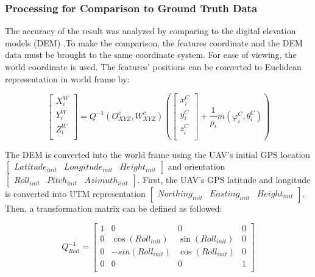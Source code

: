 \subsubsection{Processing for Comparison to Ground Truth Data}
The accuracy of the result was analyzed by comparing to the digital 
elevation models (DEM) .To make the comparison, the features coordinate 
and the DEM data must be brought to the same coordinate system. For ease 
of viewing, the world coordinate is used. The features' positions can be 
converted to Euclidean representation in world frame by: 

\begin{equation} 
\begin{bmatrix}
X_{i}^{W} \\
Y_{i}^{W} \\
Z_{i}^{W} \\
\end{bmatrix}
=Q^{-1}(O_{XYZ}^{c}, W_{XYZ}^{c})(\begin{bmatrix}
x_{i}^{C} \\
y_{i}^{C} \\
z_{i}^{C} \\
\end{bmatrix}
+\frac{1}{\rho _{i}}m(\varphi _{i}^{C}, \theta _{i}^{C}))
\end{equation}

The DEM is converted into the world frame using the UAV's initial GPS
location $\begin{bmatrix} Latitude_{init} & Longitude_{init} &
  Height_{init} \end{bmatrix}$ and orientation$\begin{bmatrix}
  Roll_{init} & Pitch_{init } & Azimuth_{init} \end{bmatrix}$. First,
the UAV's GPS latitude and longitude is converted into UTM
representation $\begin{bmatrix} Northing_{init} & Easting_{init} &
  Height_{init} \end{bmatrix}$. Then, a transformation matrix can be
defined as followed:


\begin{equation}
Q_{Roll}^{-1}=\begin{bmatrix}
1 & 0 & 0 & 0 \\
0 & \cos (Roll_{init}) & \sin (Roll_{init}) & 0 \\
0 & -sin(Roll_{init}) & \cos (Roll_{init}) & 0 \\
0 & 0 & 0 & 1 \\
\end{bmatrix}
\end{equation}


